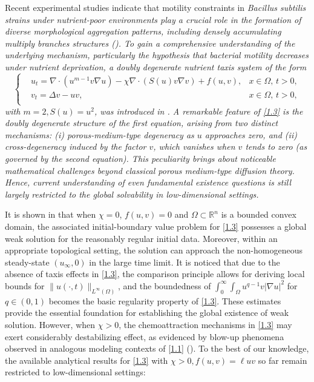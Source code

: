 \documentclass[12pt]{article}
\theoremstyle{plain}
\theoremstyle{definition}
\numberwithin{equation}{section}
\begin{document}
Recent experimental studies indicate that motility constraints in \it{Bacillus subtilis}
\rm  strains under nutrient-poor environments play a crucial role in the formation of diverse morphological aggregation patterns, including densely accumulating multiply branches structures (\cite{Fuji1, Fuji2, Matsushita}).
To gain a comprehensive understanding of the underlying mechanism, particularly the hypothesis that bacterial motility decreases under nutrient deprivation, a doubly degenerate nutrient taxis system of the form
\begin{equation}\label{1.3}
\left\{
\begin{aligned}
&u_{t}=\nabla \cdot (u^{m-1}v\nabla u)-\chi \nabla \cdot (S(u)v\nabla v)+f(u,v),&x\in \Omega,\, t>0,\\
& v_{t}=\Delta v-uv,&x\in \Omega,\, t>0,\\
\end{aligned}
\right.
\end{equation}
with $m=2, S(u)=u^2$, was  introduced  in \cite{Kawasaki, Leyva, Plaza}.
A remarkable feature of \eqref{1.3} is the doubly degenerate structure of the first equation, arising from two distinct mechanisms:
  (i) porous-medium-type degeneracy as $u$ approaches zero, and (ii) cross-degeneracy induced by the factor $ v$, which vanishes when $v$ tends to zero (as governed by the second equation).
  This peculiarity brings about noticeable mathematical challenges beyond classical porous medium-type diffusion theory.
  Hence, current understanding of even fundamental existence questions is still largely restricted to the global solvability in low-dimensional settings.

It is shown in  \cite{WCVPDE} that when $\chi=0$, $f(u,v)=0$ and $\Omega \subset\mathbb{R}^n$ is a bounded convex domain,
  the associated initial-boundary value problem for \eqref{1.3} possesses a global weak solution for the reasonably regular initial data. Moreover, within an appropriate topological setting,
  the solution can approach the non-homogeneous  steady-state $(u_\infty,0)$ in the large time limit.
  It is noticed that due to the  absence of taxis effects in \eqref{1.3}, the comparison principle
  allows for deriving local bounds for  $\|u(\cdot,t)\|_{L^\infty(\Omega)}$, and
   the boundedness of $\int_0^\infty\int_\Omega u^{q-1}v|\nabla u|^2$ for $ q\in(0,1) $ becomes the basic regularity property of \eqref{1.3}.  These estimates provide the essential foundation for establishing the global existence of  weak solution.
 However, when $\chi>0$,   the chemoattraction mechanisms in \eqref{1.3} may  exert considerably destabilizing effect,
 as evidenced by blow-up phenomena observed in analogous modeling contexts
of \eqref{1.1} (\cite{B,LW}).
 To the best of our knowledge,  the available analytical results for \eqref{1.3} with $\chi>0, f(u,v)=\ell uv$
  so far remain restricted to low-dimensional settings:
\end{document}
